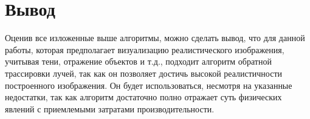 \section {Вывод}

Оценив все изложенные выше алгоритмы, можно сделать вывод, что для данной работы,
которая предполагает визуализацию реалистического изображения, учитывая тени,
отражение объектов и т.д., подходит алгоритм обратной трассировки лучей,
так как он позволяет достичь высокой реалистичности построенного изображения.
Он будет использоваться, несмотря на указанные недостатки, так как алгоритм достаточно
полно отражает суть физических явлений с приемлемыми затратами производительности.

